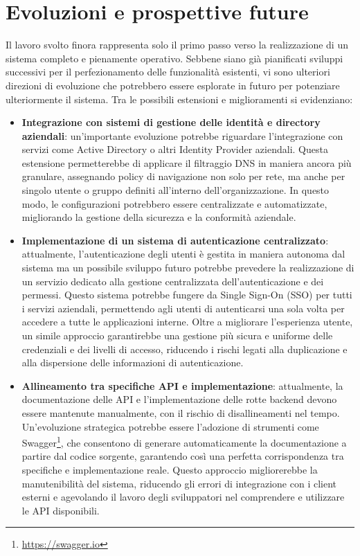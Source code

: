 \section{Evoluzioni e prospettive future}
Il lavoro svolto finora rappresenta solo il primo passo verso la realizzazione di un sistema completo e pienamente operativo. Sebbene siano già pianificati sviluppi successivi per il perfezionamento delle funzionalità esistenti, vi sono ulteriori direzioni di evoluzione che potrebbero essere esplorate in futuro per potenziare ulteriormente il sistema. Tra le possibili estensioni e miglioramenti si evidenziano:

\begin{itemize}
  \item \textbf{Integrazione con sistemi di gestione delle identità e directory aziendali}: un'importante evoluzione potrebbe riguardare l'integrazione con servizi come Active Directory o altri Identity Provider aziendali. Questa estensione permetterebbe di applicare il filtraggio DNS in maniera ancora più granulare, assegnando policy di navigazione non solo per rete, ma anche per singolo utente o gruppo definiti all’interno dell’organizzazione. In questo modo, le configurazioni potrebbero essere centralizzate e automatizzate, migliorando la gestione della sicurezza e la conformità aziendale.

  \item \textbf{Implementazione di un sistema di autenticazione centralizzato}: attualmente, l’autenticazione degli utenti è gestita in maniera autonoma dal sistema ma un possibile sviluppo futuro potrebbe prevedere la realizzazione di un servizio dedicato alla gestione centralizzata dell'autenticazione e dei permessi. Questo sistema potrebbe fungere da Single Sign-On (SSO) per tutti i servizi aziendali, permettendo agli utenti di autenticarsi una sola volta per accedere a tutte le applicazioni interne. Oltre a migliorare l’esperienza utente, un simile approccio garantirebbe una gestione più sicura e uniforme delle credenziali e dei livelli di accesso, riducendo i rischi legati alla duplicazione e alla dispersione delle informazioni di autenticazione.

  \item \textbf{Allineamento tra specifiche API e implementazione}: attualmente, la documentazione delle API e l’implementazione delle rotte backend devono essere mantenute manualmente, con il rischio di disallineamenti nel tempo. Un'evoluzione strategica potrebbe essere l'adozione di strumenti come Swagger\footnote{\url{https://swagger.io}}, che consentono di generare automaticamente la documentazione a partire dal codice sorgente, garantendo così una perfetta corrispondenza tra specifiche e implementazione reale. Questo approccio migliorerebbe la manutenibilità del sistema, riducendo gli errori di integrazione con i client esterni e agevolando il lavoro degli sviluppatori nel comprendere e utilizzare le API disponibili.
\end{itemize}

